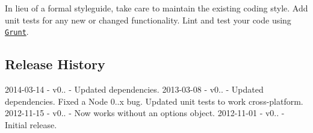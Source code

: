 In lieu of a formal styleguide, take care to maintain the existing coding style. Add unit tests for any new or changed functionality. Lint and test your code using \href{http://gruntjs.com/}{\tt Grunt}.

\subsection*{Release History}

2014-\/03-\/14 -\/ v0.. -\/ Updated dependencies. 2013-\/03-\/08 -\/ v0.. -\/ Updated dependencies. Fixed a Node 0..\+x bug. Updated unit tests to work cross-\/platform. 2012-\/11-\/15 -\/ v0.. -\/ Now works without an options object. 2012-\/11-\/01 -\/ v0.. -\/ Initial release. 